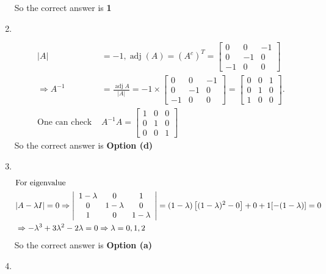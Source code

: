 \begin{enumerate}
\begin{answer}
		So the correct answer is \textbf{1}
	\end{answer}
		\item $\left. \right. $	
	\begin{answer}
		\begin{align*}
		|A|&=-1, \operatorname{adj}(A)=\left(A^{c}\right)^{T}=\left[\begin{array}{ccc}0 & 0 & -1 \\ 0 & -1 & 0 \\ -1 & 0 & 0\end{array}\right]\\
		\Rightarrow A^{-1}&=\frac{\operatorname{adj} A}{|A|}=-1 \times\left[\begin{array}{ccc}0 & 0 & -1 \\ 0 & -1 & 0 \\ -1 & 0 & 0\end{array}\right]=\left[\begin{array}{lll}0 & 0 & 1 \\ 0 & 1 & 0 \\ 1 & 0 & 0\end{array}\right] .\\
		\text{One can check }&A^{-1} A=\left[\begin{array}{lll}1 & 0 & 0 \\ 0 & 1 & 0 \\ 0 & 0 & 1\end{array}\right]
		\end{align*}
			So the correct answer is \textbf{Option (d)}
	\end{answer}
		\item $\left. \right. $	
	\begin{answer}
		\begin{align*}
		\intertext{For eigenvalue}
		&|A-\lambda I|=0 \Rightarrow\left|\begin{array}{ccc}1-\lambda & 0 & 1 \\ 0 & 1-\lambda & 0 \\ 1 & 0 & 1-\lambda\end{array}\right|=(1-\lambda)\left[(1-\lambda)^{2}-0\right]+0+1[-(1-\lambda)]=0\\
		&\Rightarrow-\lambda^{3}+3 \lambda^{2}-2 \lambda=0 \Rightarrow \lambda=0,1,2
		\end{align*}
		So the correct answer is \textbf{Option (a)}
	\end{answer}
	\item $\left. \right. $	
\begin{answer}
	\begin{align*}

\end{align*}
\end{answer}
\end{enumerate}
